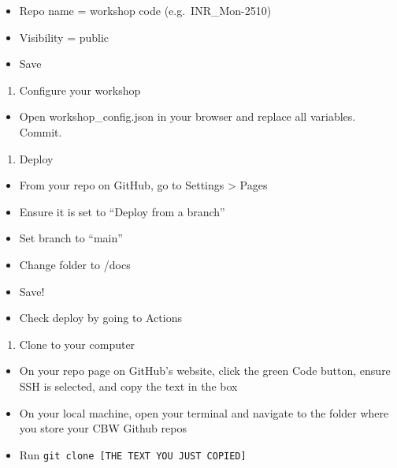 \documentclass[
]{book}
\providecommand{\tightlist}{%
  \setlength{\itemsep}{0pt}\setlength{\parskip}{0pt}}
\begin{document}
\begin{itemize}
\tightlist
\item
  Repo name = workshop code (e.g.~INR\_Mon-2510)
\item
  Visibility = public
\item
  Save
\end{itemize}

\begin{enumerate}
\def\labelenumi{\arabic{enumi}.}
\setcounter{enumi}{2}
\tightlist
\item
  Configure your workshop
\end{enumerate}

\begin{itemize}
\tightlist
\item
  Open workshop\_config.json in your browser and replace all variables. Commit.
\end{itemize}

\begin{enumerate}
\def\labelenumi{\arabic{enumi}.}
\setcounter{enumi}{3}
\tightlist
\item
  Deploy
\end{enumerate}

\begin{itemize}
\tightlist
\item
  From your repo on GitHub, go to Settings \textgreater{} Pages
\item
  Ensure it is set to ``Deploy from a branch''
\item
  Set branch to ``main''
\item
  Change folder to /docs
\item
  Save!
\item
  Check deploy by going to Actions
\end{itemize}

\begin{enumerate}
\def\labelenumi{\arabic{enumi}.}
\setcounter{enumi}{4}
\tightlist
\item
  Clone to your computer
\end{enumerate}

\begin{itemize}
\tightlist
\item
  On your repo page on GitHub's website, click the green Code button, ensure SSH is selected, and copy the text in the box
\item
  On your local machine, open your terminal and navigate to the folder where you store your CBW Github repos
\item
  Run \texttt{git\ clone\ {[}THE\ TEXT\ YOU\ JUST\ COPIED{]}}
\end{itemize}
\end{document}
